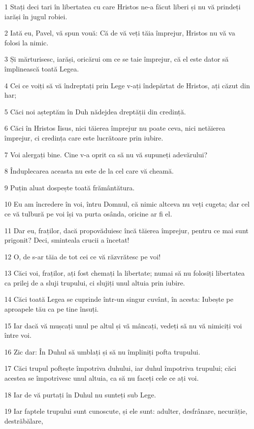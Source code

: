 \par 1 Stați deci tari în libertatea cu care Hristos ne-a făcut liberi și nu vă prindeți iarăși în jugul robiei.
\par 2 Iată eu, Pavel, vă spun vouă: Că de vă veți tăia împrejur, Hristos nu vă va folosi la nimic.
\par 3 Și mărturisesc, iarăși, oricărui om ce se taie împrejur, că el este dator să împlinească toată Legea.
\par 4 Cei ce voiți să vă îndreptați prin Lege v-ați îndepărtat de Hristos, ați căzut din har;
\par 5 Căci noi așteptăm în Duh nădejdea dreptății din credință.
\par 6 Căci în Hristos Iisus, nici tăierea împrejur nu poate ceva, nici netăierea împrejur, ci credința care este lucrătoare prin iubire.
\par 7 Voi alergați bine. Cine v-a oprit ca să nu vă supuneți adevărului?
\par 8 Înduplecarea aceasta nu este de la cel care vă cheamă.
\par 9 Puțin aluat dospește toată frământătura.
\par 10 Eu am încredere în voi, întru Domnul, că nimic altceva nu veți cugeta; dar cel ce vă tulbură pe voi își va purta osânda, oricine ar fi el.
\par 11 Dar eu, fraților, dacă propovăduiesc încă tăierea împrejur, pentru ce mai sunt prigonit? Deci, sminteala crucii a încetat!
\par 12 O, de s-ar tăia de tot cei ce vă răzvrătesc pe voi!
\par 13 Căci voi, fraților, ați fost chemați la libertate; numai să nu folosiți libertatea ca prilej de a sluji trupului, ci slujiți unul altuia prin iubire.
\par 14 Căci toată Legea se cuprinde într-un singur cuvânt, în acesta: Iubește pe aproapele tău ca pe tine însuți.
\par 15 Iar dacă vă mușcați unul pe altul și vă mâncați, vedeți să nu vă nimiciți voi între voi.
\par 16 Zic dar: În Duhul să umblați și să nu împliniți pofta trupului.
\par 17 Căci trupul poftește împotriva duhului, iar duhul împotriva trupului; căci acestea se împotrivesc unul altuia, ca să nu faceți cele ce ați voi.
\par 18 Iar de vă purtați în Duhul nu sunteți sub Lege.
\par 19 Iar faptele trupului sunt cunoscute, și ele sunt: adulter, desfrânare, necurăție, destrăbălare,
